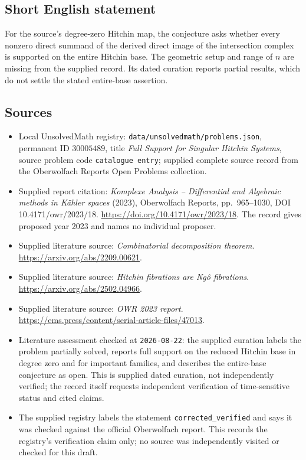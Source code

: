 \documentclass[11pt]{article}
\begin{document}
\subsection{Short English statement}
For the source's degree-zero Hitchin map, the conjecture asks whether every nonzero direct summand of the derived direct image of the intersection complex is supported on the entire Hitchin base. The geometric setup and range of \(n\) are missing from the supplied record. Its dated curation reports partial results, which do not settle the stated entire-base assertion.
\subsection{Sources}
\begin{itemize}
\item Local UnsolvedMath registry: \texttt{data/unsolvedmath/problems.json}, permanent ID \(30005489\), title \emph{Full Support for Singular Hitchin Systems}, source problem code \texttt{catalogue entry}; supplied complete source record from the Oberwolfach Reports Open Problems collection.
\item Supplied report citation: \emph{Komplexe Analysis -- Differential and Algebraic methods in Kähler spaces} (2023), Oberwolfach Reports, pp.~965--1030, DOI 10.4171/owr/2023/18. \url{https://doi.org/10.4171/owr/2023/18}. The record gives proposed year 2023 and names no individual proposer.
\item Supplied literature source: \emph{Combinatorial decomposition theorem}. \url{https://arxiv.org/abs/2209.00621}.
\item Supplied literature source: \emph{Hitchin fibrations are Ngô fibrations}. \url{https://arxiv.org/abs/2502.04966}.
\item Supplied literature source: \emph{OWR 2023 report}. \url{https://ems.press/content/serial-article-files/47013}.
\item Literature assessment checked at \texttt{2026-08-22}: the supplied curation labels the problem partially solved, reports full support on the reduced Hitchin base in degree zero and for important families, and describes the entire-base conjecture as open. This is supplied dated curation, not independently verified; the record itself requests independent verification of time-sensitive status and cited claims.
\item The supplied registry labels the statement \texttt{corrected\_verified} and says it was checked against the official Oberwolfach report. This records the registry's verification claim only; no source was independently visited or checked for this draft.
\end{itemize}
\end{document}
